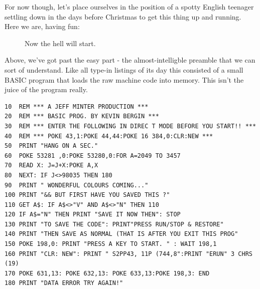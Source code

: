 For now though, let's place ourselves in the position of a spotty English teenager settling down in the days before Christmas to get
this thing up and running. Here we are, having fun: 

\begin{figure}[H]
    \centering
    \begin{adjustbox}{width=8cm,center}
    \end{adjustbox}
\caption*{Now the hell will start.}
\end{figure}

Above, we've got past the easy part - the almost-intelligble preamble that we can sort of understand.  Like all type-in listings of its day this consisted of a small BASIC program
that loads the raw machine code into memory. This isn't the juice of the program really.  

\lstset{style=C64BasicStyle}
\begin{lstlisting}
10  REM *** A JEFF MINTER PRODUCTION ***
20  REM *** BASIC PROG. BY KEVIN BERGIN ***
30  REM *** ENTER THE FOLLOWING IN DIREC T MODE BEFORE YOU START!! ***
40  REM *** POKE 43,1:POKE 44,44:POKE 16 384,0:CLR:NEW ***
50  PRINT "HANG ON A SEC."
60  POKE 53281 ,0:POKE 53280,0:FOR A=2049 TO 3457
70  READ X: J=J+X:POKE A,X
80  NEXT: IF J<>98035 THEN 180
90  PRINT " WONDERFUL COLOURS COMING..."
100 PRINT "&& BUT FIRST HAVE YOU SAVED THIS ?"
110 GET A$: IF A$<>"V" AND A$<>"N" THEN 110
120 IF A$="N" THEN PRINT "SAVE IT NOW THEN": STOP
130 PRINT "TO SAVE THE CODE": PRINT"PRESS RUN/STOP & RESTORE"
140 PRINT "THEN SAVE AS NORMAL (THAT IS AFTER YOU EXIT THIS PROG"
150 POKE 198,0: PRINT "PRESS A KEY TO START. " : WAIT 198,1
160 PRINT "CLR: NEW": PRINT " S2PP43, 11P (744,8":PRINT "ERUN" 3 CHRS (19)
170 POKE 631,13: POKE 632,13: POKE 633,13:POKE 198,3: END
180 PRINT "DATA ERROR TRY AGAIN!"
\end{lstlisting}

